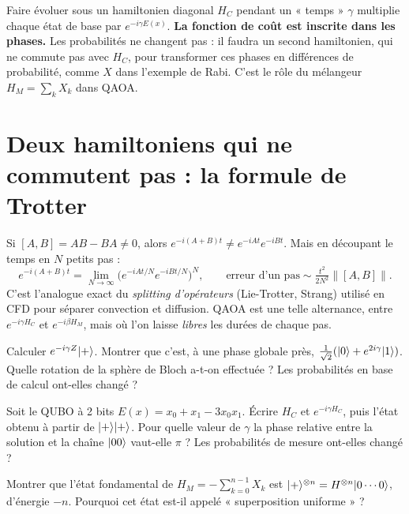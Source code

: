 \begin{resultat}
Faire évoluer sous un hamiltonien diagonal $H_C$ pendant un « temps » $\gamma$ multiplie chaque état de base par $e^{-i\gamma E(x)}$. \textbf{La fonction de coût est inscrite dans les phases.} Les probabilités ne changent pas : il faudra un second hamiltonien, qui ne commute pas avec $H_C$, pour transformer ces phases en différences de probabilité, comme $X$ dans l'exemple de Rabi. C'est le rôle du mélangeur $H_M=\sum_kX_k$ dans QAOA.
\end{resultat}

\section{Deux hamiltoniens qui ne commutent pas : la formule de Trotter}\label{sec:trotter}
Si $[A,B]=AB-BA\neq0$, alors $e^{-i(A+B)t}\neq e^{-iAt}e^{-iBt}$. Mais en découpant le temps en $N$ petits pas :
\[e^{-i(A+B)t}=\lim_{N\to\infty}\big(e^{-iAt/N}e^{-iBt/N}\big)^N,\qquad \text{erreur d'un pas}\sim\tfrac{t^2}{2N^2}\|[A,B]\|.\]
C'est l'analogue exact du \emph{splitting d'opérateurs} (Lie-Trotter, Strang) utilisé en CFD pour séparer convection et diffusion. QAOA est une telle alternance, entre $e^{-i\gamma H_C}$ et $e^{-i\beta H_M}$, mais où l'on laisse \emph{libres} les durées de chaque pas.

\exercices
\begin{exercice}
Calculer $e^{-i\gamma Z}\lvert +\rangle$. Montrer que c'est, à une phase globale près, $\tfrac1{\sqrt2}(\lvert 0\rangle+e^{2i\gamma}\lvert 1\rangle)$. Quelle rotation de la sphère de Bloch a-t-on effectuée ? Les probabilités en base de calcul ont-elles changé ?
\end{exercice}
\begin{exercice}
Soit le QUBO à 2 bits $E(x)=x_0+x_1-3x_0x_1$. Écrire $H_C$ et $e^{-i\gamma H_C}$, puis l'état obtenu à partir de $\lvert +\rangle\lvert +\rangle$. Pour quelle valeur de $\gamma$ la phase relative entre la solution et la chaîne $\lvert 00\rangle$ vaut-elle $\pi$ ? Les probabilités de mesure ont-elles changé ?
\end{exercice}
\begin{exercice}
Montrer que l'état fondamental de $H_M=-\sum_{k=0}^{n-1}X_k$ est $\lvert +\rangle^{\otimes n}=H^{\otimes n}\lvert 0\cdots0\rangle$, d'énergie $-n$. Pourquoi cet état est-il appelé « superposition uniforme » ?
\end{exercice}
